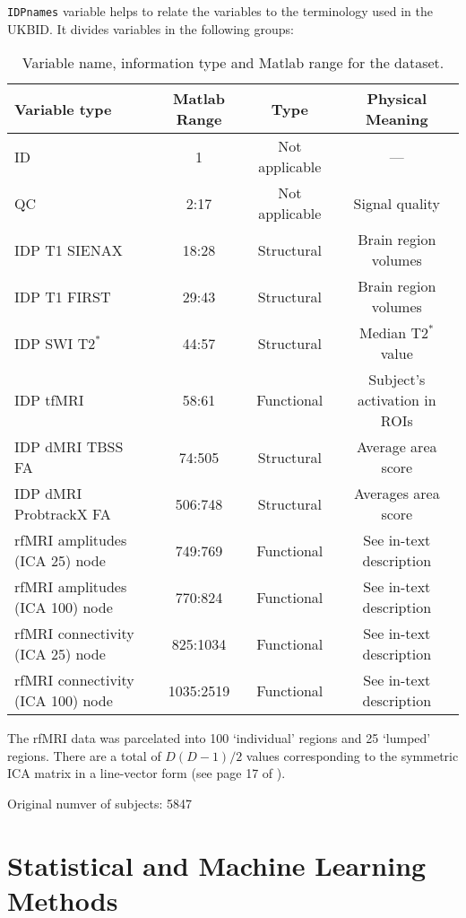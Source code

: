 \documentclass{article}
\begin{document}
{\tt IDPnames} variable helps to relate the variables to the terminology used in the UKBID. It divides variables in the following groups:
\begin{table}
  \centering
  \caption{Variable name, information type and  Matlab range for the dataset.}
  \begin{tabular}{lccc}
    \toprule
    {\bf Variable type} & {\bf Matlab Range} & {\bf Type} &{\bf Physical Meaning}\\
    \midrule
    ID  & 1 & Not applicable & --- \\
    QC  & 2:17 & Not applicable & Signal quality\\
    IDP T1 SIENAX & 18:28 & Structural & Brain region volumes\\
    IDP T1 FIRST & 29:43 & Structural & Brain region volumes\\
    IDP SWI $\text{T2}^{*}$ & 44:57 & Structural & Median $\text{T2}^{*}$ value\\
    IDP tfMRI & 58:61 & Functional & Subject's activation in ROIs\\
    IDP dMRI TBSS FA & 74:505 & Structural &  Average area score\\
    IDP dMRI ProbtrackX FA & 506:748 & Structural & Averages area score\\
    rfMRI amplitudes (ICA 25) node    & 749:769 & Functional & See in-text description\\
    rfMRI amplitudes (ICA 100) node   & 770:824 & Functional & See in-text description\\
    rfMRI connectivity (ICA 25) node  & 825:1034 & Functional & See in-text description\\
    rfMRI connectivity (ICA 100) node & 1035:2519 & Functional &  See in-text description\\
    \bottomrule
  \end{tabular}
  \label{tab:data-ranges}
\end{table}

The rfMRI data was parcelated into 100 `individual' regions and 25 `lumped' regions. There are a total of $D (D-1) / 2$ values corresponding to the symmetric ICA matrix in a line-vector form (see page 17 of \cite{Smith2016}).

Original numver of subjects: 5847

\section{Statistical and Machine Learning Methods\label{sec:methods}}
\end{document}
